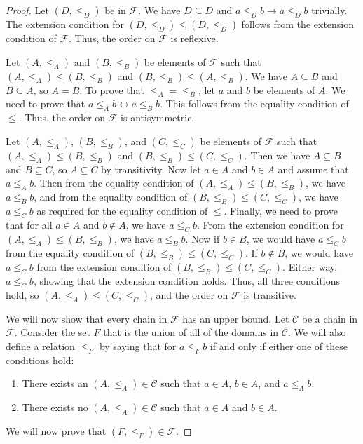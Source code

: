 \documentclass[../math.tex]{subfiles}
\begin{document}
\begin{proof}
    Let $(D, \leq_D)$ be in $\mathcal F$.  We have $D \subseteq D$ and $a \leq_D
    b \to a \leq_D b$ trivially.  The extension condition for $(D, \leq_D) \leq
    (D, \leq_D)$ follows from the extension condition of $\mathcal F$.  Thus,
    the order on $\mathcal F$ is reflexive.

    Let $(A, \leq_A)$ and $(B, \leq_B)$ be elements of $\mathcal F$ such that
    $(A, \leq_A) \leq (B, \leq_B)$ and $(B, \leq_B) \leq (A, \leq_B)$.  We have
    $A \subseteq B$ and $B \subseteq A$, so $A = B$.  To prove that $\leq_A =
    \leq_B$, let $a$ and $b$ be elements of $A$.  We need to prove that $a
    \leq_A b \leftrightarrow a \leq_B b$.  This follows from the equality
    condition of $\leq$.  Thus, the order on $\mathcal F$ is antisymmetric.

    Let $(A, \leq_A)$, $(B, \leq_B)$, and $(C, \leq_C)$ be elements of $\mathcal
    F$ such that $(A, \leq_A) \leq (B, \leq_B)$ and $(B, \leq_B) \leq (C,
    \leq_C)$.  Then we have $A \subseteq B$ and $B \subseteq C$, so $A \subseteq
    C$ by transitivity.  Now let $a \in A$ and $b \in A$ and assume that $a
    \leq_A b$.  Then from the equality condition of $(A, \leq_A) \leq (B,
    \leq_B)$, we have $a \leq_B b$, and from the equality condition of $(B,
    \leq_B) \leq (C, \leq_C)$, we have $a \leq_C b$ as required for the equality
    condition of $\leq$.  Finally, we need to prove that for all $a \in A$ and
    $b \notin A$, we have $a \leq_C b$.  From the extension condition for $(A,
    \leq_A) \leq (B, \leq_B)$, we have $a \leq_B b$.  Now if $b \in B$, we would
    have $a \leq_C b$ from the equality condition of $(B, \leq_B) \leq (C,
    \leq_C)$.  If $b \notin B$, we would have $a \leq_C b$ from the extension
    condition of $(B, \leq_B) \leq (C, \leq_C)$.  Either way, $a \leq_C b$,
    showing that the extension condition holds.  Thus, all three conditions
    hold, so $(A, \leq_A) \leq (C, \leq_C)$, and the order on $\mathcal F$ is
    transitive.

    We will now show that every chain in $\mathcal F$ has an upper bound.  Let
    $\mathcal C$ be a chain in $\mathcal F$.  Consider the set $F$ that
    is the union of all of the domains in $\mathcal C$.  We will also define a
    relation $\leq_F$ by saying that for $a \leq_F b$ if and only if either one
    of these conditions hold:
    \begin{enumerate}
        \item There exists an $(A, \leq_A) \in \mathcal C$ such that $a \in A$,
        $b \in A$, and $a \leq_A b$.
        \item There exists no $(A, \leq_A) \in \mathcal C$ such that $a \in A$
        and $b \in A$.
    \end{enumerate}
    We will now prove that $(F, \leq_F) \in \mathcal F$.


\end{proof}
\end{document}
